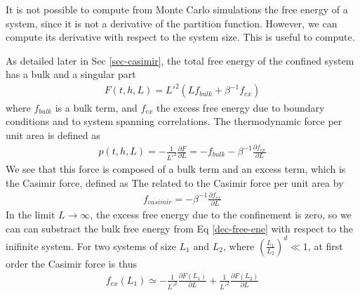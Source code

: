 It is not possible to compute from Monte Carlo simulations the free energy of a system, since it is not a derivative of the partition function. However, we can compute its derivative with respect to the system size. This is useful to compute.
{\color{brown} As detailed later in Sec \ref{sec-casimir}, the total free energy of the confined system has a bulk and a singular part
\begin{align}
    F(t,h,L) = L'^2 \left( L f_{bulk} + \beta^{-1} f_{ex} \right)
    \label{dec-free-ene}
\end{align}
where $f_{bulk}$ is a bulk term, and $f_{ex}$ the excess free energy due to boundary conditions and to system spanning correlations. 
The thermodynamic force per unit area is defined as 
\begin{align}
p(t,h,L) = - \frac{1}{L'^2 }\frac{\partial F}{\partial L} = - f_{bulk} - \beta^{-1} \frac{\partial f_{ex}}{\partial L}
\label{casmir-mc}
\end{align}
We see that this force is composed of a bulk term and an excess term, which is the Casimir force, defined as
The related to the Casimir force per unit area by
\begin{align}
   f_{casimir} = - \beta^{-1} \frac{\partial  f_{ex}}{\partial L}
\end{align}
In the limit $L\to \infty$, the excess free energy due to the confinement is zero, so we can can substract the bulk free energy from Eq \eqref{dec-free-ene} with respect to the inifinite system. For two systems of size $L_1$  and $L_2$, where $ \left( \frac{L_1}{L_2} \right)^d \ll 1$, at first order the Casimir force is thus
\begin{align}
    f_{ex}(L_1) \simeq - \frac{1}{L'^2} \frac{\partial F(L_1)}{\partial L} + \frac{1}{L'^2} \frac{\partial F(L_2)}{\partial L}
    \label{cas-diff}
\end{align}

}

